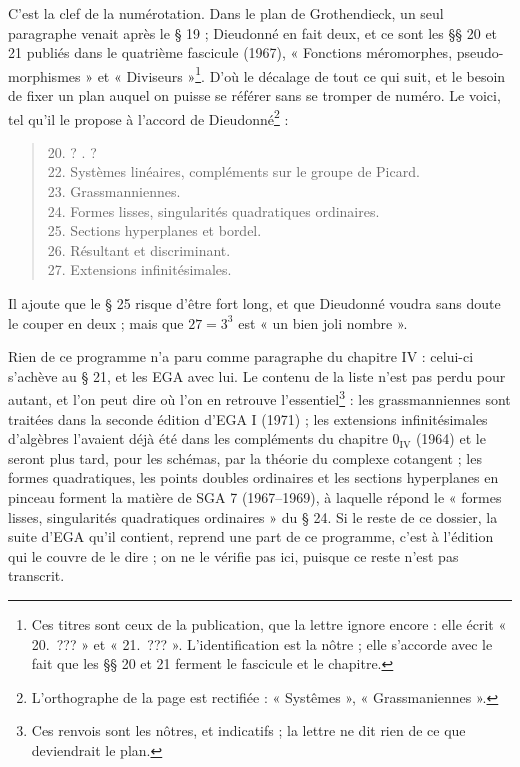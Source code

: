 \documentclass[11pt,a4paper]{article}
\begin{document}
C'est la clef de la numérotation. Dans le plan de Grothendieck, un seul
paragraphe venait après le § 19 ; Dieudonné en fait deux, et ce sont les §§ 20
et 21 publiés dans le quatrième fascicule (1967), « Fonctions méromorphes,
pseudo-morphismes » et « Diviseurs »\footnote{Ces titres sont ceux de la
publication, que la lettre ignore encore : elle écrit « 20.~??? » et
« 21.~??? ». L'identification est la nôtre ; elle s'accorde avec le fait que
les §§ 20 et 21 ferment le fascicule et le chapitre.}. D'où le décalage de
tout ce qui suit, et le besoin de fixer un plan auquel on puisse se référer
sans se tromper de numéro. Le voici, tel qu'il le propose à l'accord de
Dieudonné\footnote{L'orthographe de la page est rectifiée : « Systêmes »,
« Grassmaniennes ».} :

\begin{quote}
20. ? . ?\\
22. Systèmes linéaires, compléments sur le groupe de Picard.\\
23. Grassmanniennes.\\
24. Formes lisses, singularités quadratiques ordinaires.\\
25. Sections hyperplanes et bordel.\\
26. Résultant et discriminant.\\
27. Extensions infinitésimales.
\end{quote}

Il ajoute que le § 25 risque d'être fort long, et que Dieudonné voudra sans
doute le couper en deux ; mais que $27 = 3^3$ est « un bien joli nombre ».

Rien de ce programme n'a paru comme paragraphe du chapitre IV : celui-ci
s'achève au § 21, et les EGA avec lui. Le contenu de la liste n'est pas perdu
pour autant, et l'on peut dire où l'on en retrouve l'essentiel\footnote{Ces
renvois sont les nôtres, et indicatifs ; la lettre ne dit rien de ce que
deviendrait le plan.} : les grassmanniennes sont traitées dans la seconde
édition d'EGA I (1971) ; les extensions infinitésimales d'algèbres l'avaient
déjà été dans les compléments du chapitre $0_{\mathrm{IV}}$ (1964) et le seront
plus tard, pour les schémas, par la théorie du complexe cotangent ; les formes
quadratiques, les points doubles ordinaires et les sections hyperplanes en
pinceau forment la matière de SGA 7 (1967--1969), à laquelle répond le
« formes lisses, singularités quadratiques ordinaires » du § 24. Si le reste de ce
dossier, la suite d'EGA qu'il contient, reprend une part de ce programme, c'est
à l'édition qui le couvre de le dire ; on ne le vérifie pas ici, puisque ce
reste n'est pas transcrit.
\end{document}
